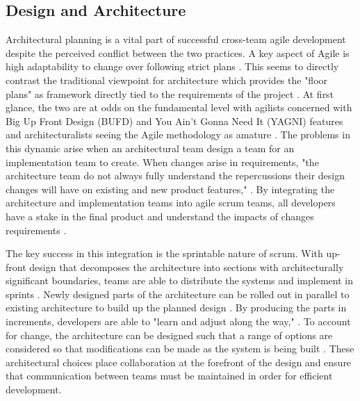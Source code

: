 \subsection{Design and Architecture}
Architectural planning is a vital part of successful cross-team agile development despite the perceived conflict between the two practices.
A key aspect of Agile is high adaptability to change over following strict plans \cite{AgileMani}.
This seems to directly contrast the traditional viewpoint for architecture which provides the "floor plans" as framework directly tied to the requirements of the project \cite{perry1992foundations}.
At first glance, the two are at odds on the fundamental level with agilists concerned with Big Up Front Design (BUFD) and You Ain't Gonna Need It (YAGNI) features and architecturalists seeing the Agile methodology as amature \cite{kruchten2010software}.
The problems in this dynamic arise when an architectural team design a team for an implementation team to create.
When changes arise in requirements, "the architecture team do not always fully understand the repercussions their design changes will have on existing and new product features," \cite{isham2008agile}.
By integrating the architecture and implementation teams into agile scrum teams, all developers have a stake in the final product and understand the impacts of changes requirements \cite{isham2008agile}.


The key success in this integration is the sprintable nature of scrum.
With up-front design that decomposes the architecture into sections with architecturally significant boundaries, teams are able to distribute the systems and implement in sprints \cite{madison2010agile}.
Newly designed parts of the architecture can be rolled out in parallel to existing architecture to build up the planned design \cite{isham2008agile}.
By producing the parts in increments, developers are able to "learn and adjust along the way," \cite{isham2008agile}.
To account for change, the architecture can be designed such that a range of options are considered so that modifications can be made as the system is being built \cite{madison2010agile}.
These architectural choices place collaboration at the forefront of the design and ensure that communication between teams must be maintained in order for efficient development.
